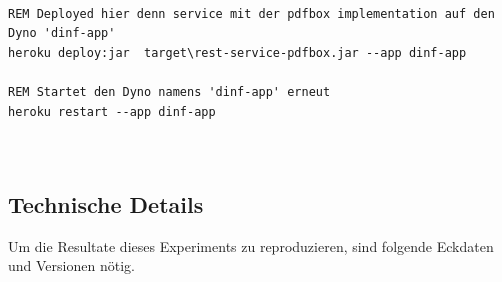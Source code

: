 \documentclass[main.tex]{subfiles}
\begin{document}
\begin{lstlisting}[language=command.com,caption={CLI Deploymentkommandos},captionpos=b]

REM Deployed hier denn service mit der pdfbox implementation auf den Dyno 'dinf-app'
heroku deploy:jar  target\rest-service-pdfbox.jar --app dinf-app

REM Startet den Dyno namens 'dinf-app' erneut
heroku restart --app dinf-app



\end{lstlisting}

\subsection{Technische Details}
Um die Resultate dieses Experiments zu reproduzieren, sind folgende Eckdaten und Versionen nötig. 
\end{document}
